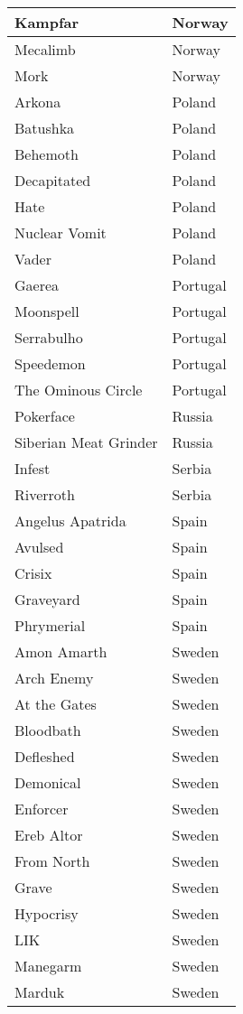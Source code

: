 \documentclass[12pt, a4paper, twoside]{report}
\begin{document}
\begin{center}
\begin{longtable}{|p{5cm}|p{5cm}|}
Kampfar & Norway \\ \hline
Mecalimb & Norway \\ \hline
Mork & Norway \\ \hline
Arkona & Poland \\ \hline
Batushka & Poland \\ \hline
Behemoth & Poland \\ \hline
Decapitated & Poland \\ \hline
Hate & Poland \\ \hline
Nuclear Vomit & Poland \\ \hline
Vader & Poland \\ \hline
Gaerea & Portugal \\ \hline
Moonspell & Portugal \\ \hline
Serrabulho & Portugal \\ \hline
Speedemon & Portugal \\ \hline
The Ominous Circle & Portugal \\ \hline
Pokerface & Russia \\ \hline
Siberian Meat Grinder & Russia \\ \hline
Infest & Serbia \\ \hline
Riverroth & Serbia \\ \hline
Angelus Apatrida & Spain \\ \hline
Avulsed & Spain \\ \hline
Crisix & Spain \\ \hline
Graveyard & Spain \\ \hline
Phrymerial & Spain \\ \hline
Amon Amarth & Sweden \\ \hline
Arch Enemy & Sweden \\ \hline
At the Gates & Sweden \\ \hline
Bloodbath & Sweden \\ \hline
Defleshed & Sweden \\ \hline
Demonical & Sweden \\ \hline
Enforcer & Sweden \\ \hline
Ereb Altor & Sweden \\ \hline
From North & Sweden \\ \hline
Grave & Sweden \\ \hline
Hypocrisy & Sweden \\ \hline
LIK & Sweden \\ \hline
Manegarm & Sweden \\ \hline
Marduk & Sweden \\ \hline

\end{longtable}
\end{center}
\end{document}
